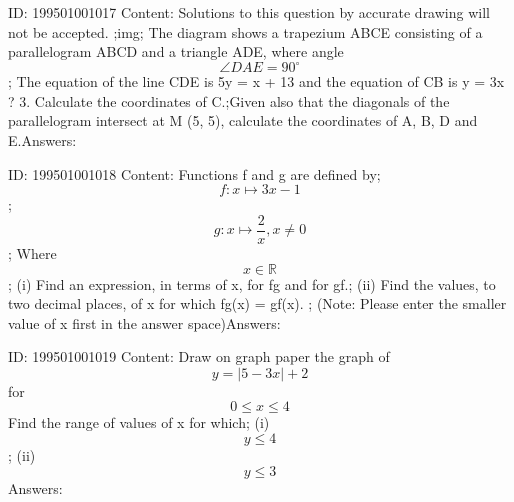 \documentclass{article}
\begin{document}
ID: 199501001017
Content:
Solutions to this question by accurate drawing will not be accepted. ;img; The diagram shows a trapezium ABCE consisting of a parallelogram ABCD and a triangle ADE, where angle \[\angle DAE = 90^{\circ}\]; The equation of the line CDE is 5y = x + 13 and the equation of CB is y = 3x ? 3.  Calculate the coordinates of C.;Given also that the diagonals of the parallelogram intersect at M (5, 5), calculate the coordinates of A, B, D and E.Answers:

ID: 199501001018
Content:
Functions f and g are defined by;
\[f:x \mapsto 3x-1 \];\[g:x \mapsto\frac{2}{x},x\neq 0\];
Where \[x\in \mathbb{R}\];
(i)	Find an expression, in terms of x, for fg and for gf.;
(ii)	Find the values, to two decimal places, of x for which fg(x) = gf(x).
; (Note: Please enter the smaller value of x first in the answer space)Answers:

ID: 199501001019
Content:
Draw on graph paper the graph of \[y=\left | 5-3x \right |+2\]  for \[0\leqslant x\leqslant 4\] Find the range of values of x for which;
(i)	\[y\leqslant 4\];
(ii)\[y\leqslant 3\]Answers:
\end{document}
